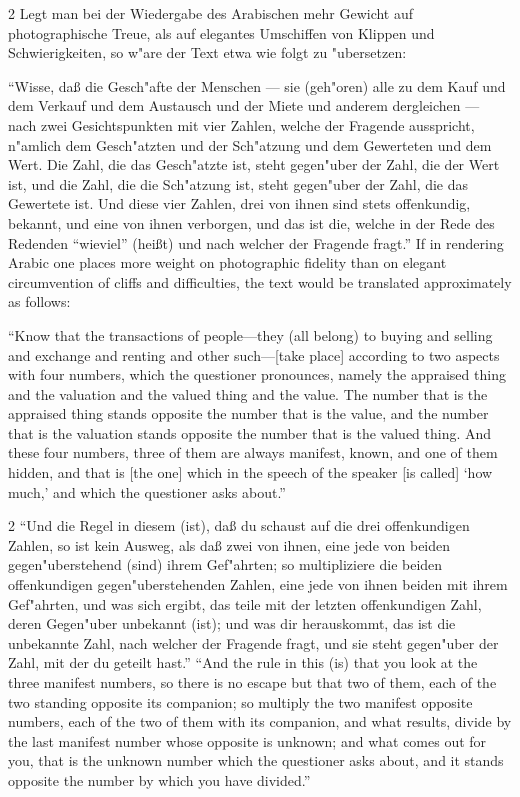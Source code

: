 \documentclass[10pt,a4paper]{article}
\renewcommand{\switchcolumn}{\syncronize\nointerlineskip\columnbreak}
\newcommand{\enquote}[1]{``#1''}
\begin{document}
\begin{paracol}{2}
Legt man bei der Wiedergabe des Arabischen mehr Gewicht auf photographische Treue, als auf elegantes Umschiffen von Klippen und Schwierigkeiten, so w"are der Text etwa wie folgt zu "ubersetzen:

\enquote{Wisse, da\ss{} die Gesch"afte der Menschen --- sie (geh"oren) alle zu dem Kauf und dem Verkauf und dem Austausch und der Miete und anderem dergleichen --- nach zwei Gesichtspunkten mit vier Zahlen, welche der Fragende ausspricht, n"amlich dem Gesch"atzten und der Sch"atzung und dem Gewerteten und dem Wert. Die Zahl, die das Gesch"atzte ist, steht gegen"uber der Zahl, die der Wert ist, und die Zahl, die die Sch"atzung ist, steht gegen"uber der Zahl, die das Gewertete ist. Und diese vier Zahlen, drei von ihnen sind stets offenkundig, bekannt, und eine von ihnen verborgen, und das ist die, welche in der Rede des Redenden \enquote{wieviel} (hei\ss{}t) und nach welcher der Fragende fragt.}
\switchcolumn
If in rendering Arabic one places more weight on photographic fidelity than on elegant circumvention of cliffs and difficulties, the text would be translated approximately as follows:

``Know that the transactions of people---they (all belong) to buying and selling and exchange and renting and other such---[take place] according to two aspects with four numbers, which the questioner pronounces, namely the appraised thing and the valuation and the valued thing and the value. The number that is the appraised thing stands opposite the number that is the value, and the number that is the valuation stands opposite the number that is the valued thing. And these four numbers, three of them are always manifest, known, and one of them hidden, and that is [the one] which in the speech of the speaker [is called] `how much,' and which the questioner asks about.''
\end{paracol}

\begin{paracol}{2}
\enquote{Und die Regel in diesem (ist), da\ss{} du schaust auf die drei offenkundigen Zahlen, so ist kein Ausweg, als da\ss{} zwei von ihnen, eine jede von beiden gegen"uberstehend (sind) ihrem Gef"ahrten; so multipliziere die beiden offenkundigen gegen"uberstehenden Zahlen, eine jede von ihnen beiden mit ihrem Gef"ahrten, und was sich ergibt, das teile mit der letzten offenkundigen Zahl, deren Gegen"uber unbekannt (ist); und was dir herauskommt, das ist die unbekannte Zahl, nach welcher der Fragende fragt, und sie steht gegen"uber der Zahl, mit der du geteilt hast.}
\switchcolumn
``And the rule in this (is) that you look at the three manifest numbers, so there is no escape but that two of them, each of the two standing opposite its companion; so multiply the two manifest opposite numbers, each of the two of them with its companion, and what results, divide by the last manifest number whose opposite is unknown; and what comes out for you, that is the unknown number which the questioner asks about, and it stands opposite the number by which you have divided.''
\end{paracol}
\end{document}

